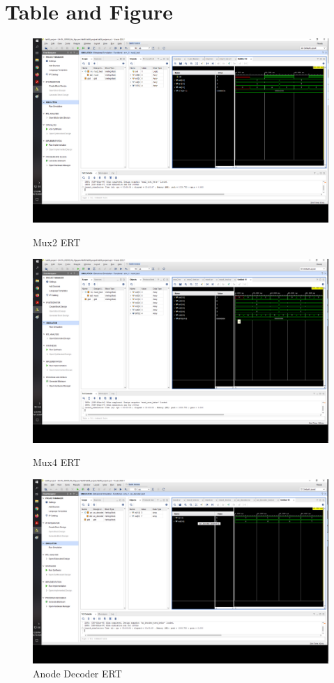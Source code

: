\documentclass[11pt]{article}
\begin{document}
\section*{Table and Figure}
\begin{figure}[ht]
	\centering
	\includegraphics[width=\textwidth,trim=24cm 23cm 0.5cm 5cm,clip]{"mux2"}
	\caption{Mux2 ERT}
	\includegraphics[width=\textwidth,trim=24cm 23cm 0.5cm 5cm,clip]{"mux4"}
	\caption{Mux4 ERT}
	\includegraphics[width=\textwidth,trim=24cm 22cm 0.5cm 5cm,clip]{"an_decoder"}
	\caption{Anode Decoder ERT}
\end{figure}
\end{document}
